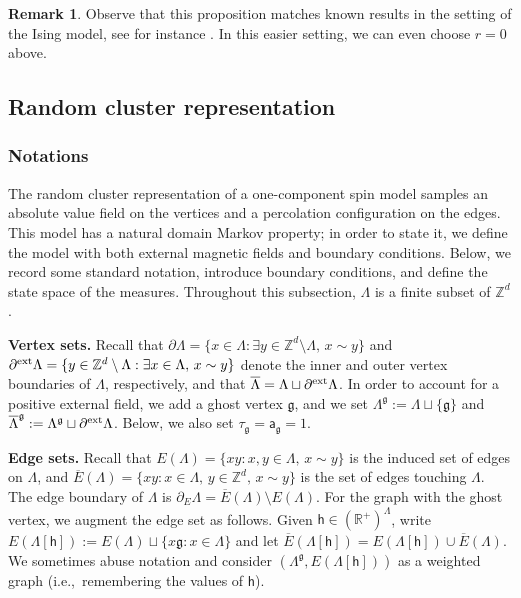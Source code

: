 \documentclass[11pt,a4paper]{article}
\numberwithin{equation}{section}
\theoremstyle{plain}
\theoremstyle{definition}
\newtheorem{Rem}[Thm]{Remark}
\newcommand\fg{\mathfrak{g}}
\begin{document}
\begin{Rem} Observe that this proposition matches known results in the setting of the Ising model, see for instance \cite[Chapter~3.6.3]{FriedliVelenikIntroStatMech2017}. In this easier setting, we can even choose $r=0$ above.
\end{Rem}


\subsection{Random cluster representation}\label{sec:randomcluster}
\subsubsection{Notations}

The random cluster representation of a one-component spin model samples an absolute value field on the vertices and a percolation configuration on the edges. This model has a natural domain Markov property; in order to state it, we define the model with both external magnetic fields and boundary conditions. Below, we record some standard notation, introduce boundary conditions, and define the state space of the measures. Throughout this subsection, $\Lambda$ is a finite subset of $\mathbb Z^d$.

\hfill

\noindent \textbf{Vertex sets.} Recall that $\partial \Lambda = \{ x\in \Lambda : \exists y \in \mathbb Z^d \setminus \Lambda, \, x \sim y \}$ and $\partial^{\textup {ext}} \Lambda=\{y \in \mathbb Z^d \setminus \Lambda: \exists x\in \Lambda, \, x\sim y\}$ denote the inner and outer vertex boundaries of $\Lambda$, respectively, and that $\overline \Lambda= \Lambda \sqcup \partial^{\textup{ext}} \Lambda$. In order to account for a positive external field, we add a ghost vertex $\mathfrak g$, and we set $\Lambda^\mathfrak g:= \Lambda \sqcup \{\mathfrak g\}$ and $\overline \Lambda^\mathfrak g:= \Lambda^{\mathfrak g}  \sqcup \partial^{\textup{ext}} \Lambda$.  Below, we also set $\tau_\fg=\mathsf{a}_\fg=1$.

\hfill

\noindent \textbf{Edge sets.} Recall that $E(\Lambda)= \{ xy : x,y \in \Lambda,\, x\sim y\}$ is the induced set of edges on $\Lambda$, and $\overline E(\Lambda) = \{ xy : x \in \Lambda, \, y \in \mathbb Z^d,\, x\sim y \}$ is the set of edges touching $\Lambda$. The edge boundary of $\Lambda$ is $\partial_E \Lambda= \overline E(\Lambda) \setminus E(\Lambda)$. For the graph with the ghost vertex, we augment the edge set as follows. Given $\mathsf h \in (\mathbb R^+)^\Lambda$, write $E(\Lambda[\mathsf h]):=E(\Lambda) \sqcup \{ x\mathfrak g: x \in \Lambda\}$ and let $\overline E(\Lambda[\mathsf h]) = E(\Lambda[\mathsf h]) \cup \overline E(\Lambda)$. We sometimes abuse notation and consider $(\Lambda^\fg,E(\Lambda[\mathsf{h}]))$ as a weighted graph (i.e.,~remembering the values of $\mathsf h$). 
\end{document}
